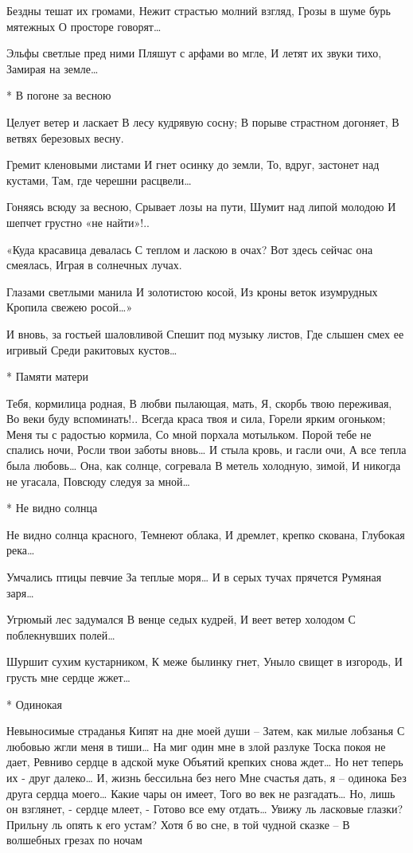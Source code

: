 Бездны тешат их громами,
Нежит страстью молний взгляд,
Грозы в шуме бурь мятежных
О просторе говорят…

Эльфы светлые пред ними
Пляшут с арфами во мгле,
И летят их звуки тихо,
Замирая на земле…


* В погоне за весною

Целует ветер и ласкает
В лесу кудрявую сосну;
В порыве страстном догоняет,
В ветвях березовых весну.

Гремит кленовыми листами
И гнет осинку до земли,
То, вдруг, застонет над кустами,
Там, где черешни расцвели…

Гоняясь всюду за весною,
Срывает лозы на пути,
Шумит над липой молодою
И шепчет грустно «не найти»!..

«Куда красавица девалась
С теплом и ласкою в очах?
Вот здесь сейчас она смеялась,
Играя в солнечных лучах.

Глазами светлыми манила
И золотистою косой,
Из кроны веток изумрудных
Кропила свежею росой…»

И вновь, за гостьей шаловливой
Спешит под музыку листов,
Где слышен смех ее игривый
Среди ракитовых кустов…


* Памяти матери

Тебя, кормилица родная,
В любви пылающая, мать,
Я, скорбь твою переживая,
Во веки буду вспоминать!..
Всегда краса твоя и сила,
Горели ярким огоньком;
Меня ты с радостью кормила,
Со мной порхала мотыльком.
Порой тебе не спались ночи,
Росли твои заботы вновь…
И стыла кровь, и гасли очи,
А все тепла была любовь…
Она, как солнце, согревала
В метель холодную, зимой,
И никогда не угасала,
Повсюду следуя за мной…


* Не видно солнца

Не видно солнца красного,
Темнеют облака,
И дремлет, крепко скована,
Глубокая река…

Умчались птицы певчие
За теплые моря…
И в серых тучах прячется
Румяная заря…

Угрюмый лес задумался
В венце седых кудрей,
И веет ветер холодом
С поблекнувших полей…

Шуршит сухим кустарником,
К меже былинку гнет,
Уныло свищет в изгородь,
И грусть мне сердце жжет…


* Одинокая

Невыносимые страданья
Кипят на дне моей души –
Затем, как милые лобзанья
С любовью жгли меня в тиши…
На миг один мне в злой разлуке
Тоска покоя не дает,
Ревниво сердце в адской муке
Объятий крепких снова ждет…
Но нет теперь их - друг далеко…
И, жизнь бессильна без него
Мне счастья дать, я – одинока
Без друга сердца моего…
Какие чары он имеет,
Того во век не разгадать…
Но, лишь он взглянет, - сердце млеет, -
Готово все ему отдать…
Увижу ль ласковые глазки?
Прильну ль опять к его устам?
Хотя б во сне, в той чудной сказке –
В волшебных грезах по ночам

